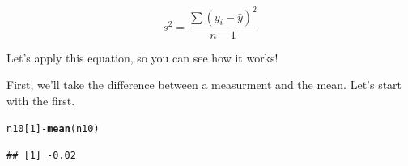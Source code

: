 \documentclass{tufte-handout}\usepackage[]{graphicx}\usepackage[]{color}
\makeatletter
\newcommand{\hlnum}[1]{\textcolor[rgb]{0.686,0.059,0.569}{#1}}%
\newcommand{\hlopt}[1]{\textcolor[rgb]{0,0,0}{#1}}%
\newcommand{\hlstd}[1]{\textcolor[rgb]{0.345,0.345,0.345}{#1}}%
\newcommand{\hlkwd}[1]{\textcolor[rgb]{0.737,0.353,0.396}{\textbf{#1}}}%
\newenvironment{kframe}{%
 \def\at@end@of@kframe{}%
 \ifinner\ifhmode%
  \def\at@end@of@kframe{\end{minipage}}%
  \begin{minipage}{\columnwidth}%
 \fi\fi%
 \def\FrameCommand##1{\hskip\@totalleftmargin \hskip-\fboxsep
 \colorbox{shadecolor}{##1}\hskip-\fboxsep
     \hskip-\linewidth \hskip-\@totalleftmargin \hskip\columnwidth}%
 \MakeFramed {\advance\hsize-\width
   \@totalleftmargin\z@ \linewidth\hsize
   \@setminipage}}%
 {\par\unskip\endMakeFramed%
 \at@end@of@kframe}
\newenvironment{knitrout}{}{} %
\makeatother
\begin{document}
\begin{equation}
s^2 = \frac{\sum(y_i - \bar{y})^2}{n-1}
\end{equation}

Let's apply this equation, so you can see how it works!

First, we'll take the difference between a measurment and the mean. Let's start with the first.
\begin{knitrout}
\color{fgcolor}\begin{kframe}
\begin{alltt}
\hlstd{n10[}\hlnum{1}\hlstd{]} \hlopt{-} \hlkwd{mean}\hlstd{(n10)}
\end{alltt}
\begin{verbatim}
## [1] -0.02
\end{verbatim}
\end{kframe}
\end{knitrout}
\end{document}

